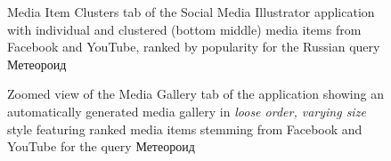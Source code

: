 \documentclass{sig-alternate}
\begin{document}
\begin{figure}[t!]
  \centering
  \caption{Media Item Clusters tab of the Social Media Illustrator application
  with individual and clustered (bottom middle) media items from Facebook and YouTube,
  ranked by popularity for the Russian query
    \selectfont Метеороид \selectfont}
  \label{fig:application}
\end{figure}

\begin{figure}[t!]
  \centering
  \caption{Zoomed view of the Media Gallery tab of the application
    showing an automatically generated media gallery in \emph{loose order, varying size} style
    featuring ranked media items stemming from Facebook and YouTube for the query
    \selectfont Метеороид \selectfont}
  \label{fig:media-gallery}
\end{figure}



\end{document}
